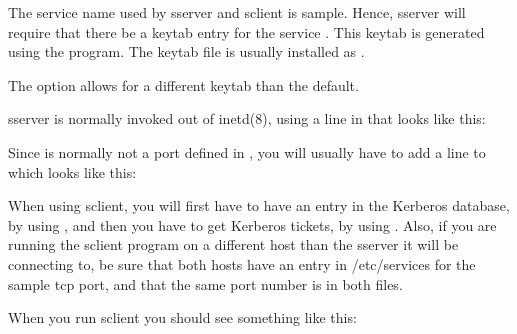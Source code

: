 \documentclass[letterpaper,10pt,english]{sphinxmanual}
\begin{document}
The service name used by sserver and sclient is sample.  Hence,
sserver will require that there be a keytab entry for the service
.  This keytab is generated
using the {\hyperref[\detokenize{admin/admin_commands/kadmin_local:kadmin-1}]{}} program.  The keytab file is usually
installed as {\hyperref[\detokenize{mitK5defaults:paths}]{}}.

The  option allows for a different keytab than the default.

sserver is normally invoked out of inetd(8), using a line in
 that looks like this:

%
\begin{sphinxVerbatim}[commandchars=\\\{\}]
      
\end{sphinxVerbatim}

Since  is normally not a port defined in ,
you will usually have to add a line to  which looks
like this:

%
\begin{sphinxVerbatim}[commandchars=\\\{\}]
          
\end{sphinxVerbatim}

When using sclient, you will first have to have an entry in the
Kerberos database, by using {\hyperref[\detokenize{admin/admin_commands/kadmin_local:kadmin-1}]{}}, and then you have to get
Kerberos tickets, by using .  Also, if you are running
the sclient program on a different host than the sserver it will be
connecting to, be sure that both hosts have an entry in /etc/services
for the sample tcp port, and that the same port number is in both
files.

When you run sclient you should see something like this:

%
\begin{sphinxVerbatim}[commandchars=\\\{\}]
   
   
  
\end{sphinxVerbatim}
\end{document}
